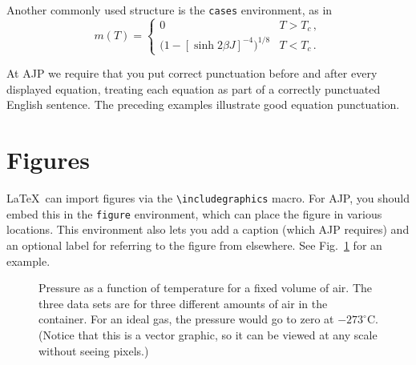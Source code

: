 \documentclass[prb,preprint]{revtex4-1}
\begin{document}
Another commonly used structure is the \texttt{cases} environment, as in
\begin{equation}
m(T) =
\begin{cases}
	0 & T > T_c \, , \\
	\bigl(1 - [\sinh 2 \beta J]^{-4} \bigr)^{1/8} & T < T_c \, .
\end{cases}
\end{equation}

At AJP we require that you put correct punctuation before and after every
displayed equation, treating each equation as part of a correctly punctuated
English sentence.\cite{mermin} The preceding examples illustrate good
equation punctuation.


\section{Figures}

\LaTeX\ can import figures via the \verb/\includegraphics/ macro.
For AJP, you should embed this in the \texttt{figure} environment, which 
can place the figure in various locations.  This environment also lets 
you add a caption (which AJP requires) and an optional label for referring 
to the figure from elsewhere.  See Fig.~\ref{gasbulbdata} for an example.

\begin{figure}[h!]
\centering
\caption{Pressure as a function of temperature for a fixed volume of air.  
The three data sets are for three different amounts of air in the container. 
For an ideal gas, the pressure would go to zero at $-273^\circ$C.  (Notice
that this is a vector graphic, so it can be viewed at any scale without
seeing pixels.)}
\label{gasbulbdata}
\end{figure}
\end{document}

